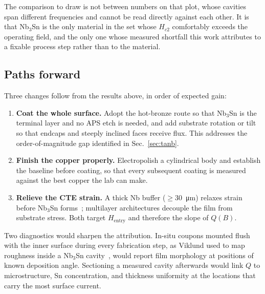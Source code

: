 The comparison to draw is not between numbers on that plot, whose cavities span different frequencies and cannot be read directly against each other. It is that Nb$_3$Sn is the only material in the set whose $H_{c2}$ comfortably exceeds the operating field, and the only one whose measured shortfall this work attributes to a fixable process step rather than to the material.

\subsection{Paths forward}

Three changes follow from the results above, in order of expected gain:

\begin{enumerate}
    \item \textbf{Coat the whole surface.} Adopt the hot-bronze route so that Nb$_3$Sn is the terminal layer and no APS etch is needed, and add substrate rotation or tilt so that endcaps and steeply inclined faces receive flux. This addresses the order-of-magnitude gap identified in Sec.~\ref{sec:tanb}.
    \item \textbf{Finish the copper properly.} Electropolish a cylindrical body and establish the baseline before coating, so that every subsequent coating is measured against the best copper the lab can make.
    \item \textbf{Relieve the CTE strain.} A thick Nb buffer ($\geq$\qty{30}{\micro\meter}) relaxes strain before Nb$_3$Sn forms~\cite{Ilyina-Brunner:2019iay}; multilayer architectures decouple the film from substrate stress. Both target $H_\text{entry}$ and therefore the slope of $Q(B)$.
\end{enumerate}

Two diagnostics would sharpen the attribution. In-situ coupons mounted flush with the inner surface during every fabrication step, as Viklund used to map roughness inside a Nb$_3$Sn cavity~\cite{Viklund:2023nlq}, would report film morphology at positions of known deposition angle. Sectioning a measured cavity afterwards would link $Q$ to microstructure, Sn concentration, and thickness uniformity at the locations that carry the most surface current.
